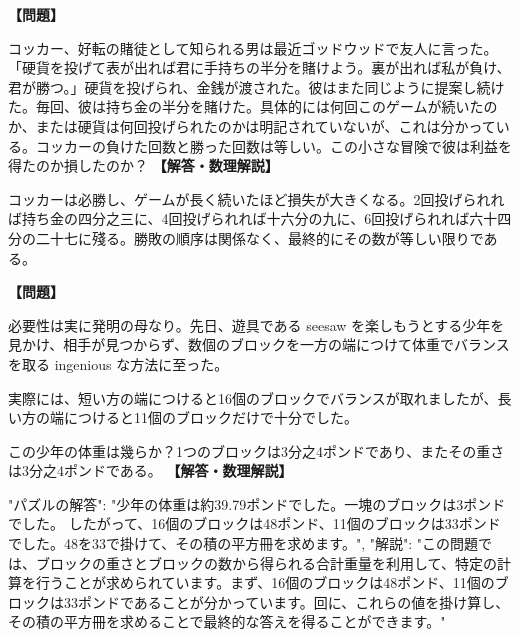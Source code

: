 \documentclass[10pt,a4paper,oneside,openany]{ltjsbook}
\begin{document}
\begin{tcolorbox}[colback=softblue,colframe=primaryblue,title=\textbf{第 121 問：コッカーズの Heads or Tails （原題: HEADS OR TAILS.）},arc=2mm,boxrule=1pt,breakable]
\textbf{【問題】}\par\vspace{0.3em}
コッカー、好転の賭徒として知られる男は最近ゴッドウッドで友人に言った。「硬貨を投げて表が出れば君に手持ちの半分を賭けよう。裏が出れば私が負け、君が勝つ。」硬貨を投げられ、金銭が渡された。彼はまた同じように提案し続けた。毎回、彼は持ち金の半分を賭けた。具体的には何回このゲームが続いたのか、または硬貨は何回投げられたのかは明記されていないが、これは分かっている。コッカーの負けた回数と勝った回数は等しい。この小さな冒険で彼は利益を得たのか損したのか？
\tcblower
\textbf{【解答・数理解説】}\par\vspace{0.3em}
コッカーは必勝し、ゲームが長く続いたほど損失が大きくなる。2回投げられれば持ち金の四分之三に、4回投げられれば十六分の九に、6回投げられれば六十四分の二十七に殘る。勝敗の順序は関係なく、最終的にその数が等しい限りである。
\end{tcolorbox}

\begin{tcolorbox}[colback=softblue,colframe=primaryblue,title=\textbf{第 122 問：THE SEE-SAW PUZZLE.},arc=2mm,boxrule=1pt,breakable]
\textbf{【問題】}\par\vspace{0.3em}
必要性は実に発明の母なり。先日、遊具である seesaw を楽しもうとする少年を見かけ、相手が見つからず、数個のブロックを一方の端につけて体重でバランスを取る ingenious な方法に至った。

実際には、短い方の端につけると16個のブロックでバランスが取れましたが、長い方の端につけると11個のブロックだけで十分でした。

この少年の体重は幾らか？1つのブロックは3分之4ポンドであり、またその重さは3分之4ポンドである。
\tcblower
\textbf{【解答・数理解説】}\par\vspace{0.3em}
{
"パズルの解答": "少年の体重は約39.79ポンドでした。一塊のブロックは3ポンドでした。
したがって、16個のブロックは48ポンド、11個のブロックは33ポンドでした。48を33で掛けて、その積の平方冊を求めます。",
"解説": "この問題では、ブロックの重さとブロックの数から得られる合計重量を利用して、特定の計算を行うことが求められています。まず、16個のブロックは48ポンド、11個のブロックは33ポンドであることが分かっています。回に、これらの値を掛け算し、その積の平方冊を求めることで最終的な答えを得ることができます。"
}
\end{tcolorbox}
\end{document}
